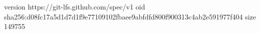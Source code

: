 version https://git-lfs.github.com/spec/v1
oid sha256:d08fc17a5d1d7d1f9e77109102fbaee9abfdfd800f900313c4ab2e591977f404
size 149755

